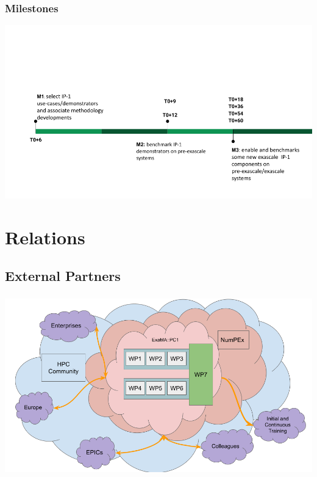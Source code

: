 \begin{frame}
  \frametitle{Milestones}
\vspace{-0.5cm}
  \begin{center}
    \includegraphics[width=\linewidth]{../../figures/exama-timeline.png}
  \end{center}




\end{frame}




\section{Relations}

\subsection*{External Partners}

\begin{frame}[plain]
  \frametitle{}
  \framesubtitle{}
\begin{center}
  \includegraphics[width=.9\linewidth]{../../figures/exama-relations.png}
\end{center}
  
\end{frame}

